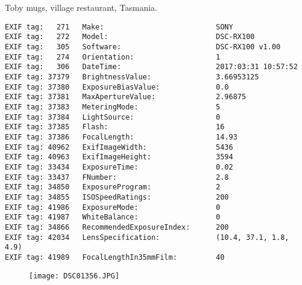 \section{\protect{}}
\noindent Toby mugs, village restaurant, Tasmania.
\noindent
\begin{lstlisting}
EXIF tag:   271   Make:                          SONY
EXIF tag:   272   Model:                         DSC-RX100
EXIF tag:   305   Software:                      DSC-RX100 v1.00
EXIF tag:   274   Orientation:                   1
EXIF tag:   306   DateTime:                      2017:03:31 10:57:52
EXIF tag: 37379   BrightnessValue:               3.66953125
EXIF tag: 37380   ExposureBiasValue:             0.0
EXIF tag: 37381   MaxApertureValue:              2.96875
EXIF tag: 37383   MeteringMode:                  5
EXIF tag: 37384   LightSource:                   0
EXIF tag: 37385   Flash:                         16
EXIF tag: 37386   FocalLength:                   14.93
EXIF tag: 40962   ExifImageWidth:                5436
EXIF tag: 40963   ExifImageHeight:               3594
EXIF tag: 33434   ExposureTime:                  0.02
EXIF tag: 33437   FNumber:                       2.8
EXIF tag: 34850   ExposureProgram:               2
EXIF tag: 34855   ISOSpeedRatings:               200
EXIF tag: 41986   ExposureMode:                  0
EXIF tag: 41987   WhiteBalance:                  0
EXIF tag: 34866   RecommendedExposureIndex:      200
EXIF tag: 42034   LensSpecification:             (10.4, 37.1, 1.8, 4.9)
EXIF tag: 41989   FocalLengthIn35mmFilm:         40

\end{lstlisting}
\clearpage
\begin{figure}
\raggedleft
\texttt{[image: DSC01356.JPG]}
\end{figure}


\clearpage
